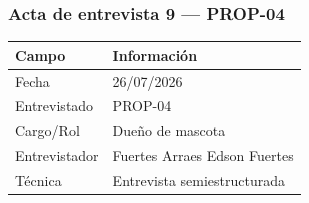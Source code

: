 \documentclass[journal,onecolumn]{IEEEtran}
\begin{document}
	
	\subsubsection*{Acta de entrevista 9 --- PROP-04}
	
	\begin{table}[H]
		\centering\small
		\begin{tabularx}{\textwidth}{@{}l X@{}}
			\toprule
			\textbf{Campo} & \textbf{Información} \\
			\midrule
			
			Fecha & 26/07/2026 \\
			
			Entrevistado & PROP-04 \\
			
			Cargo/Rol & Dueño de mascota \\
			
			Entrevistador & Fuertes Arraes Edson Fuertes \\
			
			Técnica & Entrevista semiestructurada \\
			
			\bottomrule
		\end{tabularx}
	\end{table}
	
\end{document}

